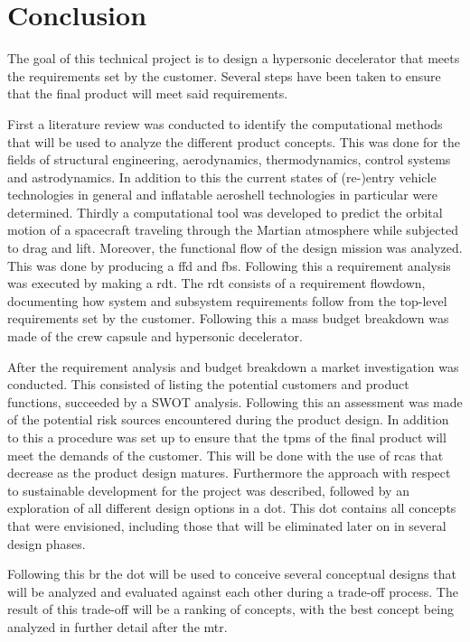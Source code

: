 \section{Conclusion}\label{cha:conclusion}
The goal of this technical project is to design a hypersonic decelerator that meets the requirements set by the customer. Several steps have been taken to ensure that the final product will meet said requirements.

First a literature review was conducted to identify the computational methods that will be used to analyze the different product concepts. This was done for the fields of structural engineering, aerodynamics, thermodynamics, control systems and astrodynamics. In addition to this the current states of (re-)entry vehicle technologies in general and inflatable aeroshell technologies in particular were determined. Thirdly a computational tool was developed to predict the orbital motion of a spacecraft traveling through the Martian atmosphere while subjected to drag and lift.
 Moreover, the functional flow of the design mission was analyzed. This was done by producing a \acrlong{ffd} and \acrlong{fbs}. Following this a requirement analysis was executed by making a \acrlong{rdt}. The \gls{rdt} consists of a requirement flowdown, documenting how system and subsystem requirements follow from the top-level requirements set by the customer.  Following this a mass budget breakdown was made of the crew capsule and hypersonic decelerator.

After the requirement analysis and budget breakdown a market investigation was conducted. This consisted of listing the potential customers and product functions, succeeded by a SWOT analysis. Following this an assessment was made of the potential risk sources encountered during the product design. In addition to this a procedure was set up to ensure that the \acrlong{tpm}s of the final product will meet the demands of the customer. This will be done with the use of \acrlong{rca}s that decrease as the product design matures. Furthermore the approach with respect to sustainable development for the project was described, followed by an exploration of all different design options in a \acrfull{dot}. This \gls{dot} contains all concepts that were envisioned, including those that will be eliminated later on in several design phases.

Following this \acrfull{br} the \gls{dot} will be used to conceive several conceptual designs that will be analyzed and evaluated against each other during a trade-off process. The result of this trade-off will be a ranking of concepts, with the best concept being analyzed in further detail after the \acrfull{mtr}.